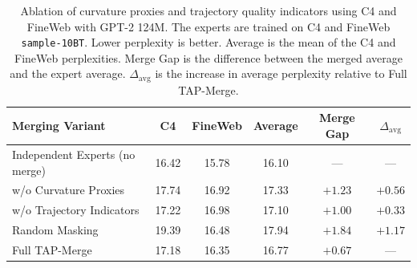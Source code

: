 \documentclass[fleqn,10pt]{wlscirep}
\begin{document}
\begin{table}[t]
\centering
\small
\caption{Ablation of curvature proxies and trajectory quality indicators using C4 and FineWeb with GPT-2 124M. The experts are trained on C4 and FineWeb \texttt{sample-10BT}. Lower perplexity is better. Average is the mean of the C4 and FineWeb perplexities. Merge Gap is the difference between the merged average and the expert average. $\Delta_{\mathrm{avg}}$ is the increase in average perplexity relative to Full TAP-Merge.}
\label{tab:ablation_curvature_trajectory}
\begin{tabular}{lccccc}
\toprule
\textbf{Merging Variant}
& \textbf{C4}
& \textbf{FineWeb}
& \textbf{Average}
& \textbf{Merge Gap}
& $\Delta_{\mathrm{avg}}$ \\
\midrule
Independent Experts (no merge)
& 16.42 & 15.78 & 16.10 & --- & --- \\
\midrule
w/o Curvature Proxies
& 17.74 & 16.92 & 17.33 & $+1.23$ & $+0.56$ \\
w/o Trajectory Indicators
& 17.22 & 16.98 & 17.10 & $+1.00$ & $+0.33$ \\
Random Masking
& 19.39 & 16.48 & 17.94 & $+1.84$ & $+1.17$ \\
\midrule
Full TAP-Merge
& 17.18 & 16.35 & 16.77 & $+0.67$ & --- \\
\bottomrule
\end{tabular}
\end{table}
\end{document}
